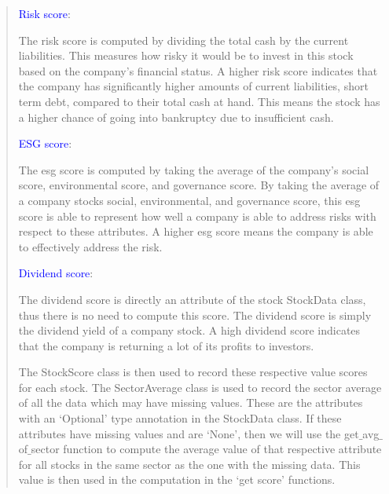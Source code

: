 \documentclass[fontsize=12pt]{article}
\begin{document}
\begin{quote}
\textcolor{blue}{Risk score}:

The risk score is computed by dividing the total cash by the current liabilities. This measures how risky it would be to invest in this stock based on the company’s financial status. A higher risk score indicates that the company has significantly higher amounts of current liabilities, short term debt, compared to their total cash at hand. This means the stock has a higher chance of going into
bankruptcy due to insufficient cash.

\textcolor{blue}{ESG score}:

The esg score is computed by taking the average of the company's social score, environmental score, and governance score. By taking the average of a company stocks social, environmental, and governance score, this esg score is able
to represent how well a company is able to address risks with respect to these attributes. A higher esg score means the company is able to effectively address the risk.

\textcolor{blue}{Dividend score}:

The dividend score is directly an attribute of the stock StockData class, thus there is no need to compute this score. The dividend score is simply the dividend yield of a company stock. A high dividend score indicates that the company is returning a lot of its profits to investors. 

The StockScore class is then used to record these respective value scores for each stock. The SectorAverage class is used to record the sector average of all the data which may have missing values. These are the attributes with an ‘Optional’ type annotation in the StockData class. If these attributes have missing values and are ‘None’, then we will use the get$\_$avg$\_$of$\_$sector function to compute the average value of that respective attribute for all stocks in the same sector as the one with the missing data. This value is then used in the computation in the ‘get score’ functions. 
\end{quote}
\end{document}
